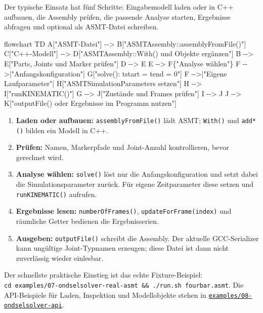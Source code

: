 \documentclass[
  12pt
]{book}
\newenvironment{Shaded}{}{}
\newcommand{\NormalTok}[1]{#1}
\providecommand{\tightlist}{%
  \setlength{\itemsep}{0pt}\setlength{\parskip}{0pt}}
\begin{document}
Der typische Einsatz hat fünf Schritte: Eingabemodell laden oder in C++
aufbauen, die Assembly prüfen, die passende Analyse starten, Ergebnisse
abfragen und optional als ASMT-Datei schreiben.

\begin{Shaded}
\begin{Highlighting}[]
\NormalTok{flowchart TD}
\NormalTok{    A["ASMT{-}Datei"] {-}{-}\textgreater{} B["ASMTAssembly::assemblyFromFile()"]}
\NormalTok{    C["C++{-}Modell"] {-}{-}\textgreater{} D["ASMTAssembly::With() und Objekte ergänzen"]}
\NormalTok{    B {-}{-}\textgreater{} E["Parts, Joints und Marker prüfen"]}
\NormalTok{    D {-}{-}\textgreater{} E}
\NormalTok{    E {-}{-}\textgreater{} F\{"Analyse wählen"\}}
\NormalTok{    F {-}{-}\textgreater{}|"Anfangskonfiguration"| G["solve(): tstart = tend = 0"]}
\NormalTok{    F {-}{-}\textgreater{}|"Eigene Laufparameter"| H["ASMTSimulationParameters setzen"]}
\NormalTok{    H {-}{-}\textgreater{} I["runKINEMATIC()"]}
\NormalTok{    G {-}{-}\textgreater{} J["Zustände und Frames prüfen"]}
\NormalTok{    I {-}{-}\textgreater{} J}
\NormalTok{    J {-}{-}\textgreater{} K["outputFile() oder Ergebnisse im Programm nutzen"]}
\end{Highlighting}
\end{Shaded}

\begin{enumerate}
\def\labelenumi{\arabic{enumi}.}
\tightlist
\item
  \textbf{Laden oder aufbauen:} \texttt{assemblyFromFile()} lädt ASMT;
  \texttt{With()} und \texttt{add*()} bilden ein Modell in C++.
\item
  \textbf{Prüfen:} Namen, Markerpfade und Joint-Anzahl kontrollieren,
  bevor gerechnet wird.
\item
  \textbf{Analyse wählen:} \texttt{solve()} löst nur die
  Anfangskonfiguration und setzt dabei die Simulationsparameter zurück.
  Für eigene Zeitparameter diese setzen und \texttt{runKINEMATIC()}
  aufrufen.
\item
  \textbf{Ergebnisse lesen:} \texttt{numberOfFrames()},
  \texttt{updateForFrame(index)} und räumliche Getter bedienen die
  Ergebnisserien.
\item
  \textbf{Ausgeben:} \texttt{outputFile()} schreibt die Assembly. Der
  aktuelle GCC-Serializer kann ungültige Joint-Typnamen erzeugen; diese
  Datei ist dann nicht zuverlässig wieder einlesbar.
\end{enumerate}

Der schnellste praktische Einstieg ist das echte Fixture-Beispiel:
\texttt{cd\ examples/07-ondselsolver-real-asmt\ \&\&\ ./run.sh\ fourbar.asmt}.
Die API-Beispiele für Laden, Inspektion und Modellobjekte stehen in
\href{./examples/08-ondselsolver-api/README.md}{\texttt{examples/08-ondselsolver-api}}.
\end{document}
